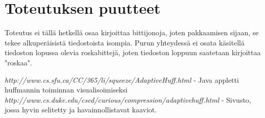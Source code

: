 \documentclass[11pt,a4paper,draft]{article}
\begin{document}
	
	\section{Toteutuksen puutteet} %
	\label{sec:toteutuksen_puutteet}
	
	Toteutus ei tällä hetkellä osaa kirjoittaa bittijonoja, joten pakkaamisen sijaan, se tekee alkuperäisistä tiedostoista isompia.
	Purun yhteydessä ei osata käsitellä tiedoston lopussa olevia roskabittejä, joten tiedoston loppuun saatetaan kirjoittaa "roskaa".
	
	
	\begin{thebibliography}{99}
		 \emph{http://www.cs.sfu.ca/CC/365/li/squeeze/AdaptiveHuff.html} - Java appletti huffmannin toiminnan visualisoimiseksi
		 \emph{http://www.cs.duke.edu/csed/curious/compression/adaptivehuff.html} - Sivusto, jossa hyvin selitetty ja havainnollistavat kaaviot.
	\end{thebibliography}
	
\end{document}
